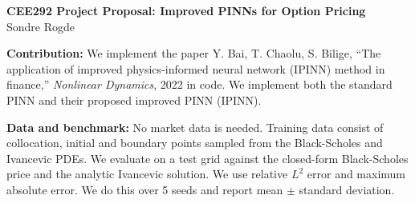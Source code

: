 \documentclass[11pt]{article}
\begin{document}
\begin{center}
{\large\bfseries CEE292 Project Proposal: Improved PINNs for Option Pricing}\\[2pt]
Sondre Rogde
\end{center}

\textbf{Contribution:} We implement the paper Y. Bai, T. Chaolu, S. Bilige, ``The application of improved physics-informed neural network (IPINN) method in finance,'' \emph{Nonlinear Dynamics}, 2022 in code.
We implement both the standard PINN and their proposed improved PINN (IPINN).

\textbf{Data and benchmark:} No market data is needed. 
Training data consist of collocation, initial and boundary points sampled from the Black-Scholes and Ivancevic PDEs.
We evaluate on a test grid against the closed-form Black-Scholes price and the analytic Ivancevic solution.
We use relative $L^2$ error and maximum absolute error. 
We do this over 5 seeds and report mean $\pm$ standard deviation.
\end{document}
